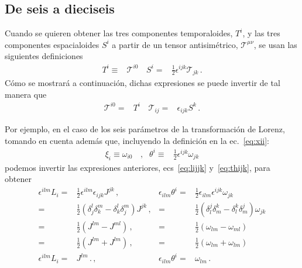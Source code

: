 \subsection{De seis a dieciseis}
\begin{frame}
Cuando se quieren obtener las tres componentes temporaloides, $T^i$, y las tres componentes espacialoides $S^i$
a partir de un tensor antisimétrico, $\mathcal{T}^{\mu\nu}$, se usan las siguientes definiciones
\begin{align}
  T^i\equiv &\mathcal{T}^{i0}\,& S^i=& \frac{1}{2}\epsilon^{ijk}\mathcal{T}_{jk}\,.
\end{align}
Cómo se mostrará a continuación, dichas expresiones se puede invertir de tal manera que
\begin{align}
  \mathcal{T}^{i0}= &T^i\,& \mathcal{T}_{ij} =&\epsilon_{ijk}S^k\,.
\end{align}
\end{frame}

Por ejemplo, en el caso de los seis parámetros de la transformación de Lorenz, tomando en cuenta además que, incluyendo la definición  en la ec.~\eqref{eq:xii}:
\begin{align}
\label{eq:thijk}
\xi_i\equiv \omega_{i0}&\,,&\theta^i\equiv&\frac{1}{2}\epsilon^{ijk}\omega_{jk}
\end{align}
podemos invertir las expresiones anteriores, ecs~\eqref{eq:lijjk} y~\eqref{eq:thijk}, para obtener
\begin{align}
\epsilon^{ilm}L_i=&\frac{1}{2}\epsilon^{ilm}\epsilon_{ijk}J^{jk}               \,,&\epsilon_{ilm}\theta^i=&\frac{1}{2}\epsilon_{ilm}\epsilon^{ijk}\omega_{jk}         \nonumber\\
  =&\frac{1}{2}\left( \delta_j^l\delta_k^m-\delta_k^l\delta_j^m \right)J^{jk} \,,& =&\frac{1}{2}\left( \delta_l^j\delta_m^k-\delta_l^k\delta_m^j \right)\omega_{jk} \nonumber\\
  =&\frac{1}{2}\left(J^{lm}-J^{ml} \right)                                   \,,& =&\frac{1}{2}\left(\omega_{lm}-\omega_{ml} \right)                         \nonumber\\
  =&\frac{1}{2}\left(J^{lm}+J^{lm} \right)                                   \,,& =&\frac{1}{2}\left(\omega_{lm}+\omega_{lm} \right)                     \nonumber\\
\epsilon^{ilm}L_i=&J^{lm}\,.                                                                \,,&\epsilon_{ilm}\theta^i=&\omega_{lm}\,.
\end{align}

